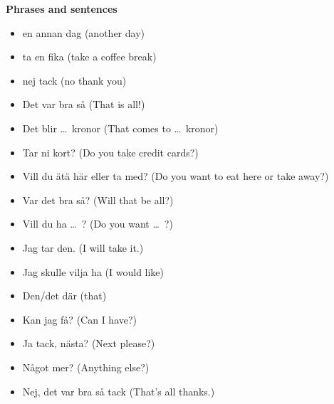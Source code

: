 
\begin{flushleft}
    \textbf{Phrases and sentences}
    \begin{itemize}
        \item en annan dag (another day)
        \item ta en fika (take a coffee break)
        \item nej tack (no thank you)
        \item Det var bra så (That is all!)
        \item Det blir \ldots\ kronor (That comes to \ldots\ kronor)
        \item Tar ni kort? (Do you take credit cards?)
        \item Vill du ätä här eller ta med? (Do you want to eat here or take away?)
        \item Var det bra så? (Will that be all?)
        \item Vill du ha \ldots\ ? (Do you want \ldots\ ?)
        \item Jag tar den. (I will take it.)
        \item Jag skulle vilja ha (I would like)
        \item Den/det där (that)
        \item Kan jag få? (Can I have?)
        \item Ja tack, nästa? (Next please?)
        \item Något mer? (Anything else?)
        \item Nej, det var bra så tack (That's all thanks.)
    \end{itemize}
\end{flushleft}

